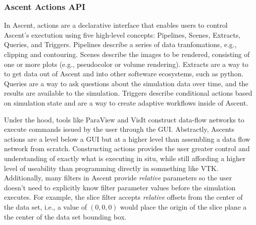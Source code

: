 \subsubsection{Ascent Actions API}
In Ascent, actions are a declarative interface that enables users to
control Ascent's exectution using five high-level concepts:
Pipelines, Scenes, Extracts, Queries, and Triggers.
%
Pipelines describe a series of data tranfomations, e.g.,
clipping and contouring.
%
Scenes describe the images to be rendered, consisting of one or more
plots (e.g., pseudocolor or volume rendering).
%
Extracts are a way to to get data out of Ascent and into other softeware
ecosystems, such as python.
%
Queries are a way to ask questions about the simulation data over time, and
the results are available to the simulation.
%
Triggers describe conditional actions based on simulation state and are a way
to create adaptive workflows inside of Ascent.

Under the hood, tools like ParaView and VisIt construct data-flow networks
to execute commands issued by the user through the GUI.
%
Abstractly, Ascents actions are a level below a GUI but at a higher level
than assembling a data flow network from scratch.
%
Constructing actions provides the user greater control and understanding
of exactly what is executing in situ, while still affording a higher level of
useability than programming directly in somnething like VTK.
%
Additionally, many filters in Ascent provide \textit{relative}
parameters so the user doesn't need to explicitly know filter parameter values
before the simulation executes.
%
For example, the slice filter accepts \textit{relative} offsets from the
center of the data set, i.e., a value of $(0,0,0)$ would place the origin
of the slice plane a the center of the data set bounding box.

%


